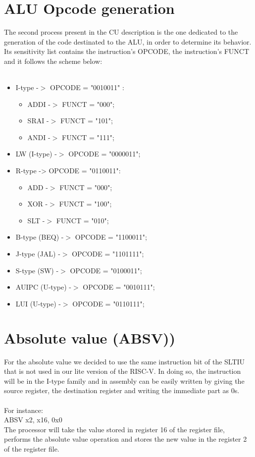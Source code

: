 \section{ALU Opcode generation}
The second process present in the CU description is the one dedicated to the generation of the code destinated to the ALU, in order to determine its behavior.
Its sensitivity list contains the instruction's OPCODE, the instruction's FUNCT and it follows the scheme below:\\
\\
\begin{itemize}
	\item I-type -$>$ OPCODE = "0010011" :
		\begin{itemize}
			\item ADDI -$>$ FUNCT = "000";
			\item SRAI -$>$ FUNCT = "101";
			\item ANDI -$>$ FUNCT = "111";
		\end{itemize}
	\item LW (I-type) -$>$ OPCODE = "0000011";
	\item R-type -> OPCODE = "0110011":
		\begin{itemize}
			\item ADD -$>$ FUNCT = "000";
			\item XOR -$>$ FUNCT = "100";
			\item SLT -$>$ FUNCT = "010";
		\end{itemize}
	\item B-type (BEQ) -$>$ OPCODE = "1100011";
	\item J-type (JAL) -$>$ OPCODE = "1101111";
	\item S-type (SW) -$>$ OPCODE = "0100011";
	\item AUIPC (U-type) -$>$ OPCODE = "0010111";
	\item LUI (U-type) -$>$ OPCODE = "0110111";		
\end{itemize}

\section{Absolute value (ABSV))}

For the absolute value we decided to use the same instruction bit of the SLTIU that is not used in our lite version of the RISC-V. In doing so, the instruction will be in the I-type family and in assembly can be easily written by giving the source register, the destination register and writing the immediate part as 0s.\\\\
For instance:\\ 
ABSV x2, x16, 0x0\\
The processor will take the value stored in register 16 of the register file, performs the absolute value operation and stores the new value in the register 2 of the register file.\\\\

